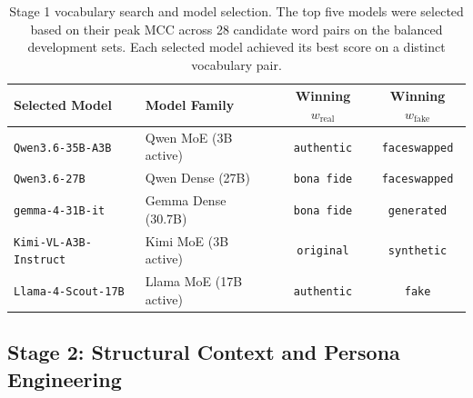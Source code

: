 \begin{table}[t]
	\centering
	\caption{Stage 1 vocabulary search and model selection. The top five models were selected based on their peak MCC across 28 candidate word pairs on the balanced development sets. Each selected model achieved its best score on a distinct vocabulary pair.}
	\label{tab:stage1_winners}
	\begin{tabular}{llcc}
		\toprule
		\textbf{Selected Model} & \textbf{Model Family} & \textbf{Winning $w_{\text{real}}$} & \textbf{Winning $w_{\text{fake}}$} \\
		\midrule
		\texttt{Qwen3.6-35B-A3B}     & Qwen MoE (3B active)  & \texttt{authentic}  & \texttt{faceswapped} \\
		\texttt{Qwen3.6-27B}         & Qwen Dense (27B)      & \texttt{bona fide}  & \texttt{faceswapped} \\
		\texttt{gemma-4-31B-it}      & Gemma Dense (30.7B)   & \texttt{bona fide}  & \texttt{generated}   \\
		\texttt{Kimi-VL-A3B-Instruct}& Kimi MoE (3B active)  & \texttt{original}   & \texttt{synthetic}   \\
		\texttt{Llama-4-Scout-17B}   & Llama MoE (17B active)& \texttt{authentic}  & \texttt{fake}        \\
		\bottomrule
	\end{tabular}
\end{table}

\subsection{Stage 2: Structural Context and Persona Engineering}
\label{subsec:stage2_structure}

